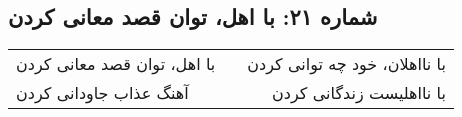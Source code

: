 \begin{center}
\section*{شماره ۲۱: با اهل، توان قصد معانی کردن}
\label{sec:021}
\begin{longtable}{l p{0.5cm} r}
با اهل، توان قصد معانی کردن
&&
با نااهلان، خود چه توانی کردن
\\
آهنگ عذاب جاودانی کردن
&&
با نااهلیست زندگانی کردن
\\
\end{longtable}
\end{center}
